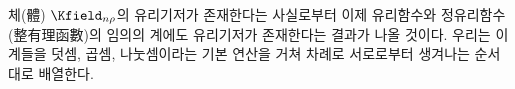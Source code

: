 
체(體) $\Kfield_{n\rho}$의 유리기저가 존재한다는 사실로부터 이제 유리함수와 정유리함수(整有理函數)의 임의의 계에도 유리기저가 존재한다는 결과가 나올 것이다. 우리는 이 계들을 덧셈, 곱셈, 나눗셈이라는 기본 연산을 거쳐 차례로 서로로부터 생겨나는 순서대로 배열한다.
